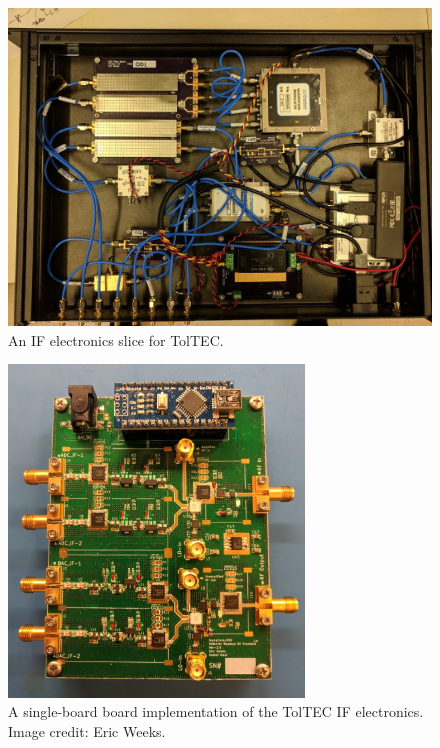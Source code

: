 \begin{figure}[!htbp]
\centering
\includegraphics[width=\textwidth]{figures/conclusion/toltec_slice_2}
\caption[~An IF electronics slice for TolTEC.]{An IF electronics slice for TolTEC.}
\label{fig:toltec slice}
\end{figure}

\begin{figure}[!htbp]
\centering
\includegraphics[width=0.7\textwidth]{figures/conclusion/single_board}
\caption[~A single-board board implementation of the TolTEC IF electronics.]{A single-board board implementation of the TolTEC IF electronics. Image credit: Eric Weeks.}
\label{fig:single board}
\end{figure}
